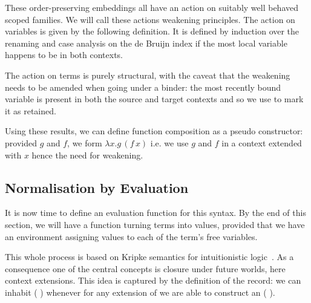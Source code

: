 \documentclass{article}
\begin{document}
\noindent
\begin{minipage}{.3\textwidth}
\end{minipage}\hfill
\begin{minipage}{.5\textwidth}
\end{minipage}

These order-preserving embeddings all have an action on suitably
well behaved scoped families. We will call these actions weakening
principles.
%
The action on variables is given
by the following  definition. It is defined by
induction over the renaming and case analysis on the de Bruijn
index if the most local variable happens to be in both contexts.


The action on terms is purely structural, with the caveat that
the weakening needs to be amended when going under a binder: the
most recently bound variable is present in both the source and
target contexts and so we use  to mark it as retained.


Using these results, we can define function composition
as a pseudo constructor: provided $g$ and $f$, we form
$λx.g\,(f\, x)$ i.e. we use $g$ and $f$ in a context extended
with $x$ hence the need for weakening.

\label{def:composition}


\subsection{Normalisation by Evaluation}

It is now time to define an evaluation function for this syntax.
By the end of this section, we will have a function turning terms
into values, provided that we have an environment assigning values
to each of the term's free variables.


This whole process is based on Kripke semantics for intuitionistic
logic~\cite{DBLP:journals/apal/MitchellM91}.
As a consequence one of the central concepts is closure under future
worlds, here context extensions.
This idea is captured by the definition of the  record: we
can inhabit (  ) whenever for any extension
 of  we are able to construct an ( ).
\end{document}
